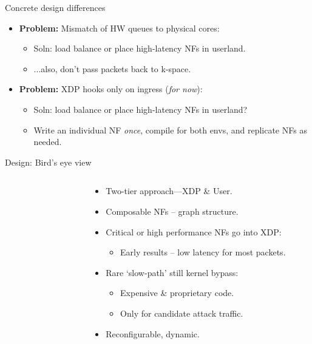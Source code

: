 \documentclass[aspectratio=169,xcolor={dvipsnames}
,handout
]{beamer}
\begin{document}
\begin{frame}{Concrete design differences}
	\begin{itemize}
		\item \textbf{Problem:} Mismatch of HW queues to physical cores:
		\begin{itemize}
			\item \alert{Soln:} load balance or place high-latency NFs in userland.
			\item ...also, don't pass packets back to k-space.
		\end{itemize}
		\item \textbf{Problem:} XDP hooks only on ingress (\emph{for now}):
		\begin{itemize}
			\item \alert{Soln:} load balance or place high-latency NFs in userland?
			\item Write an individual NF \emph{once}, compile for both envs, and replicate NFs as needed.
		\end{itemize}
	\end{itemize}
\end{frame}

\begin{frame}{Design: Bird's eye view}
	\begin{columns}
		\begin{column}{0.5\linewidth}
			\begin{figure}
				\centering
				\resizebox{0.9\linewidth}{!}{\hspace{-0.9cm}\hspace{-0.2cm}}
			\end{figure}
		\end{column}
		\begin{column}{0.5\linewidth}
			\begin{itemize}
				\item Two-tier approach---XDP \& User.
				\item Composable NFs -- graph structure.
				\item Critical or high performance NFs go into XDP:
				\begin{itemize}
					\item Early results -- \alert{low latency for most packets}.
				\end{itemize}
				\item Rare `slow-path' still kernel bypass:
				\begin{itemize}
					\item Expensive \& proprietary code.
					\item Only for candidate attack traffic.
				\end{itemize}
				\item Reconfigurable, dynamic.
			\end{itemize}
		\end{column}
	\end{columns}
\end{frame}
\end{document}
